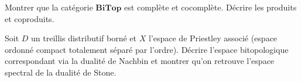 \begin{exercice}
Montrer que la cat\'egorie $\mathbf{BiTop}$ est compl\`ete et cocompl\`ete. D\'ecrire les
produits et coproduits.
\end{exercice}

\begin{exercice}
Soit $D$ un treillis distributif born\'e et $X$ l'espace de Priestley associ\'e (espace
ordonn\'e compact totalement s\'epar\'e par l'ordre). D\'ecrire l'espace bitopologique
correspondant via la dualit\'e de Nachbin et montrer qu'on retrouve l'espace spectral de
la dualit\'e de Stone.
\end{exercice}
